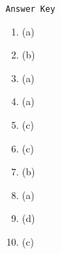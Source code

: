 \begin{center}
\texttt{Answer Key}
\begin{multicols}{5}
\begin{enumerate}
\item (a)
\item (b)
\item (a)
\item (a)
\item (c)
\item (c)
\item (b)
\item (a)
\item (d)
\item (c)
\end{enumerate}
\end{multicols}
\end{center}
